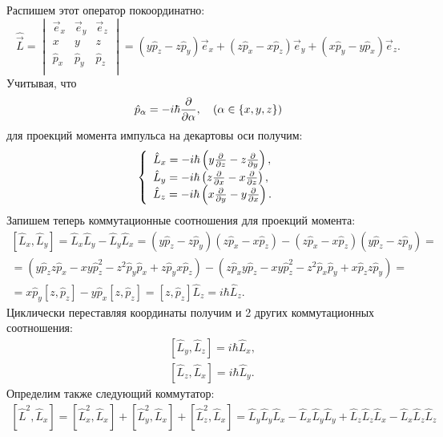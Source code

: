 \documentclass{hedexams}
\begin{document}
Распишем этот оператор покоординатно:
\[
    \hat{\vec{L}} =
    \begin{vmatrix}
        \vec{e}_x & \vec{e}_y & \vec{e}_z \\
        x         & y         & z         \\
        \hat{p}_x & \hat{p}_y & \hat{p}_z \\
    \end{vmatrix} =
    (y\hat{p}_z - z\hat{p}_y)\vec{e}_x +
    (z\hat{p}_x - x\hat{p}_z)\vec{e}_y +
    (x\hat{p}_y - y\hat{p}_x)\vec{e}_z.
\]
Учитывая, что
\[
    \hat{p}_\alpha = -i\hbar\frac{\partial }{\partial \alpha}, \quad (\alpha \in \{ x,y,z \})
\]
для проекций момента импульса на декартовы оси получим:
\[
    \left\{
        \begin{array}{l}
            \hat{L}_x = -i\hbar\left( y\frac{\partial }{\partial z} - z\frac{\partial }{\partial y} \right),\\
            \hat{L}_y = -i\hbar\left( z\frac{\partial }{\partial x} - x\frac{\partial }{\partial z} \right),\\
            \hat{L}_z = -i\hbar\left( x\frac{\partial }{\partial y} - y\frac{\partial }{\partial x} \right).\\
        \end{array}
    \right.
\]
Запишем теперь коммутационные соотношения для проекций момента:
\begin{gather*}
    \left[\hat{L}_x, \hat{L}_y\right] = \hat{L}_x\hat{L}_y - \hat{L}_y\hat{L}_x=
    (y\hat{p}_z - z\hat{p}_y)(z\hat{p}_x - x\hat{p}_z) -
    (z\hat{p}_x - x\hat{p}_z)(y\hat{p}_z - z\hat{p}_y) =\\
    =(y\hat{p}_z z\hat{p}_x - xy\hat{p}_z^2 - z^2\hat{p}_y\hat{p}_x +
    z\hat{p}_y x\hat{p}_z) -
    (z\hat{p}_x y\hat{p}_z - xy\hat{p}_z^2 - z^2\hat{p}_x\hat{p}_y +
    x\hat{p}_z z\hat{p}_y) =\\
    =x\hat{p}_y [z, \hat{p}_z] - y\hat{p}_x[z, \hat{p}_z]=
    [z, \hat{p}_z]\hat{L}_z = i\hbar\hat{L}_z.
\end{gather*}
Циклически переставляя координаты получим и 2 других коммутационных соотношения:
\begin{align*}
    & \left[\hat{L}_y, \hat{L}_z\right] = i\hbar\hat{L}_x,\\
    & \left[\hat{L}_z, \hat{L}_x\right] = i\hbar\hat{L}_y.
\end{align*}
Определим также следующий коммутатор:
\begin{gather*}
    \left[ \hat{L}^2, \hat{L}_x \right] = \left[ \hat{L}_x^2, \hat{L}_x \right]
    + \left[ \hat{L}_y^2, \hat{L}_x \right] +
    \left[ \hat{L}_z^2, \hat{L}_x \right] =
    \hat{L}_y\hat{L}_y\hat{L}_x - \hat{L}_x\hat{L}_y\hat{L}_y +
    \hat{L}_z\hat{L}_z\hat{L}_x - \hat{L}_x\hat{L}_z\hat{L}_z
\end{gather*}
\end{document}
